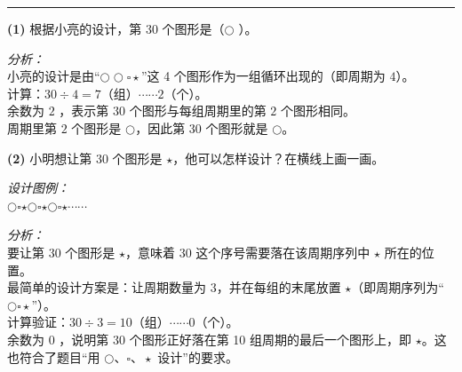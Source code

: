 \vspace{0.8cm}
\hrule
\vspace{0.5cm}

{\small
\textbf{(1)} 根据小亮的设计，第 30 个图形是（\quad \textbf{$\bigcirc$} \quad）。

\vspace{0.3cm}
\textit{分析：}\\
小亮的设计是由“$\bigcirc \bigcirc \square \star$”这 4 个图形作为一组循环出现的（即周期为 $4$）。\\
计算：$30 \div 4 = 7$（组）$\cdots\cdots 2$（个）。\\
余数为 $2$ ，表示第 $30$ 个图形与每组周期里的第 $2$ 个图形相同。\\
周期里第 $2$ 个图形是 $\bigcirc$，因此第 $30$ 个图形就是 $\bigcirc$。

\vspace{0.8cm}
\textbf{(2)} 小明想让第 30 个图形是 $\star$，他可以怎样设计？在横线上画一画。

\vspace{0.3cm}
\textit{设计图例：}\\
\underline{\quad \Large $\bigcirc$\quad$\square$\quad$\star$\quad$\bigcirc$\quad$\square$\quad$\star$\quad$\bigcirc$\quad$\square$\quad$\star$\quad$\cdots\cdots$ \quad}

\vspace{0.6cm}
\textit{分析：}\\
要让第 $30$ 个图形是 $\star$，意味着 $30$ 这个序号需要落在该周期序列中 $\star$ 所在的位置。\\
最简单的设计方案是：让周期数量为 $3$，并在每组的末尾放置 $\star$（即周期序列为“$\bigcirc\square\star$”）。\\
计算验证：$30 \div 3 = 10$（组）$\cdots\cdots 0$（个）。\\
余数为 $0$ ，说明第 $30$ 个图形正好落在第 10 组周期的最后一个图形上，即 $\star$。这也符合了题目“用 $\bigcirc、\square、\star$ 设计”的要求。
}


